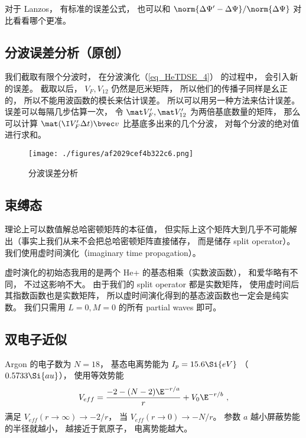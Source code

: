 对于 Lanzos， 有标准的误差公式， 也可以和 $\norm{\Delta \Psi' - \Delta \Psi}/\norm{\Delta \Psi}$ 对比看看哪个更准。

\subsection{分波误差分析（原创）}
我们截取有限个分波时， 在分波演化（\autoref{eq_HeTDSE_4}） 的过程中， 会引入新的误差。 截取以后， $V_F, V_{12}$ 仍然是厄米矩阵， 所以他们的传播子同样是幺正的， 所以不能用波函数的模长来估计误差。 所以可以用另一种方法来估计误差。 误差可以每隔几步估算一次， 令 $\mat V'_F, \mat V'_{12}$ 为两倍基底数量的矩阵， 那么可以计算 $\mat (\I V'_F\Delta t) \bvec v$ 比基底多出来的几个分波， 对每个分波的绝对值进行求和。
\begin{figure}[ht]
\centering
\texttt{[image: ./figures/af2029cef4b322c6.png]}
\caption{分波误差分析} \label{fig_HeTDSE_1}
\end{figure}

\subsection{束缚态}
理论上可以数值解总哈密顿矩阵的本征值， 但实际上这个矩阵大到几乎不可能解出（事实上我们从来不会把总哈密顿矩阵直接储存， 而是储存 split operator）。 我们使用虚时间演化（imaginary time propagation）。

虚时演化的初始态我用的是两个 He+ 的基态相乘（实数波函数）， 和爱华略有不同， 不过这影响不大。 由于我们的 split operator 都是实数矩阵， 使用虚时间后其指数函数也是实数矩阵， 所以虚时间演化得到的基态波函数也一定会是纯实数。
我们只需用 $L = 0, M = 0$ 的所有 partial waves 即可。

\subsection{双电子近似}
Argon 的电子数为 $N = 18$， 基态电离势能为 $I_p = 15.6\Si{eV}$ （$0.5733\Si{au}$）， 使用等效势能
\begin{equation}
V_{eff} = \frac{-2 - (N-2)\E^{-r/a}}{r} + V_0 \E^{-r/b}~,
\end{equation}
满足 $V_{eff}(r\to\infty) \to -2/r$， 当 $V_{eff}(r\to 0) \to -N/r$。 参数 $a$ 越小屏蔽势能的半径就越小， 越接近于氦原子， 电离势能越大。
